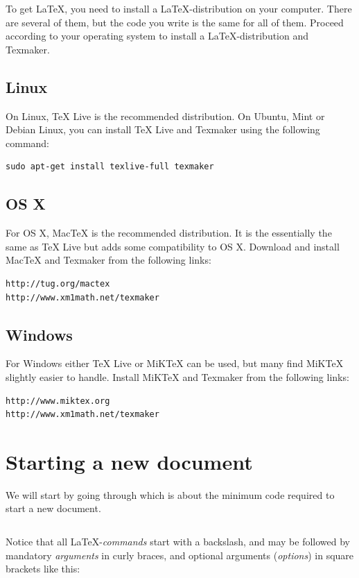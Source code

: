 To get \LaTeX{}, you need to install a \LaTeX{}-distribution on your computer. There are several of them, but the code you write is the same for all of them. Proceed according to your operating system to install a \LaTeX-distribution and Texmaker.

\subsection{Linux}
On Linux, TeX Live is the recommended distribution. On Ubuntu, Mint or Debian Linux, you can install TeX Live and Texmaker using the following command:
\begin{verbatim}
sudo apt-get install texlive-full texmaker
\end{verbatim}

\subsection{OS X}
For OS X, MacTeX is the recommended distribution. It is the essentially the same as TeX Live but adds some compatibility to OS X. Download and install MacTeX and Texmaker from the following links:

\begin{verbatim}
http://tug.org/mactex
http://www.xm1math.net/texmaker
\end{verbatim}

\subsection{Windows}
For Windows either TeX Live or MiKTeX can be used, but many find MiKTeX slightly easier to handle. Install MiKTeX and Texmaker from the following links:

\begin{verbatim}
http://www.miktex.org
http://www.xm1math.net/texmaker
\end{verbatim}

\section{Starting a new document}
We will start by going through  which is about the minimum code required to start a new document.
\begin{listing}
	\inputminted{latex}{latex/first.tex}
	\caption{A minimal \LaTeX{} document}
	\label{lst:latex:minimal}
\end{listing}
Notice that all \LaTeX{}-\emph{commands} start with a backslash, and may be followed by mandatory \emph{arguments} in curly braces, and optional arguments (\emph{options}) in square brackets like this:

